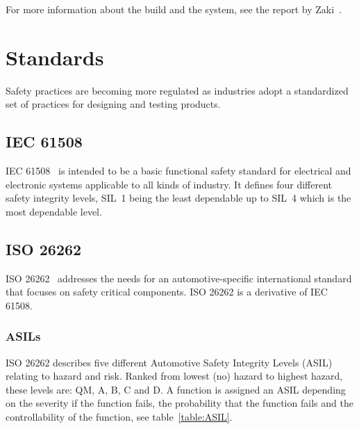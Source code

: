 For more information about the build and the system, see the report by Zaki~\cite{zaki2016}.

\section{Standards}
Safety practices are becoming more regulated as industries adopt a standardized set of practices for designing and testing products. %

\subsection{IEC 61508}
IEC 61508~\cite{IEC61508} is intended to be a basic functional safety standard for electrical and electronic systems applicable to all kinds of industry. It defines four different safety integrity levels, SIL~1 being the least dependable up to SIL~4 which is the most dependable level.

\subsection{ISO 26262}
ISO 26262~\cite{ISO26262} addresses the needs for an automotive-specific international standard that focuses on safety critical components. ISO 26262 is a derivative of IEC 61508.

\subsubsection{ASILs}
ISO 26262 describes five different Automotive Safety Integrity Levels (ASIL) relating to hazard and risk. Ranked from lowest (no) hazard to highest hazard, these levels are: QM, A, B, C and D. A function is assigned an ASIL depending on the severity if the function fails, the probability that the function fails and the controllability of the function, see table~\ref{table:ASIL}.

